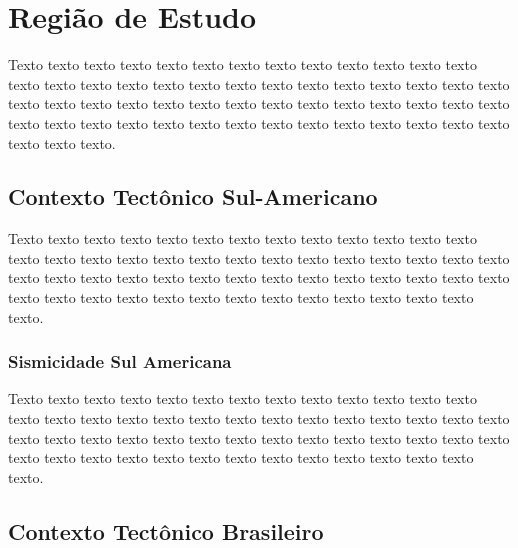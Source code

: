 \chapter{Região de Estudo}
\label{cap:regiao_de_estudo}

Texto texto texto texto texto texto texto texto texto texto texto texto texto
texto texto texto texto texto texto texto texto texto texto texto texto texto
texto texto texto texto texto texto texto texto texto texto texto texto texto
texto texto texto texto texto texto texto texto texto texto texto texto texto
texto texto texto texto texto texto.

\section{Contexto Tectônico Sul-Americano}
\label{sec:03_america_do_sul}

Texto texto texto texto texto texto texto texto texto texto texto texto texto
texto texto texto texto texto texto texto texto texto texto texto texto texto
texto texto texto texto texto texto texto texto texto texto texto texto texto
texto texto texto texto texto texto texto texto texto texto texto texto texto
texto texto texto.


\subsection{Sismicidade Sul Americana}
\label{sec:03_america_do_sul_seismicity}

Texto texto texto texto texto texto texto texto texto texto texto texto texto
texto texto texto texto texto texto texto texto texto texto texto texto texto
texto texto texto texto texto texto texto texto texto texto texto texto texto
texto texto texto texto texto texto texto texto texto texto texto texto texto
texto texto texto.


\section{Contexto Tectônico Brasileiro}
\label{sec:fundamentos}

